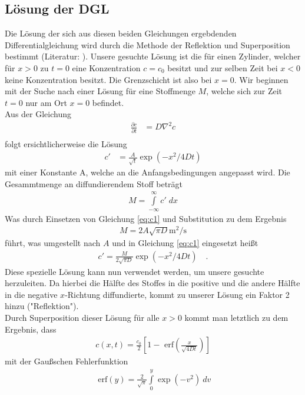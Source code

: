 \documentclass[12pt,a4paper,titlepage,headinclude,bibtotoc]{scrartcl}
\newcommand{\erf}[1]{\text{ erf}\ensuremath{\left( #1 \right)}}
\begin{document}
\subsection{Lösung der DGL}
Die Lösung der sich aus diesen beiden Gleichungen ergebdenden Differentialgleichung wird durch die Methode der Reflektion und Superposition bestimmt (Literatur: \cite[S. 11]{crank}).
Unsere gesuchte Lösung ist die für einen Zylinder, welcher für $x>0$ zu $t=0$ eine Konzentration $c=c_0$ besitzt und zur selben Zeit bei $x<0$ keine Konzentration besitzt.
Die Grenzschicht ist also bei $x=0$.
Wir beginnen mit der Suche nach einer Lösung für eine Stoffmenge $M$, welche sich zur Zeit $t=0$ nur am Ort $x=0$ befindet.\\
Aus der Gleichung
\begin{align*}
\frac{\partial c}{\partial t}&=D\nabla^2 c\\
\end{align*}
folgt ersichtlicherweise die Lösung
\begin{align}
c'&=\frac{A}{\sqrt{t}}\exp\left(-x^2/4Dt \right)\label{eq:c1}
\end{align}
mit einer Konstante A, welche an die Anfangsbedingungen angepasst wird.
Die Gesammtmenge an diffundierendem Stoff beträgt
\begin{align*}
M=\int\limits_{-\infty}^\infty c' \; dx
\end{align*}
Was durch Einsetzen von Gleichung \eqref{eq:c1} und Substitution zu dem Ergebnis
\begin{align*}
M=2A\sqrt{\pi D}\text{m}^2/\text{s}
\end{align*}
führt, was umgestellt nach $A$ und in Gleichung \eqref{eq:c1} eingesetzt heißt
\begin{align*}
c'=\frac{M}{2\sqrt{\pi D}}\exp\left(-x^2/4Dt\right)\quad .
\end{align*}
Diese spezielle Lösung kann nun verwendet werden, um unsere gesuchte herzuleiten.
Da hierbei die Hälfte des Stoffes in die positive und die andere Hälfte in die negative $x$-Richtung diffundierte, kommt zu unserer Lösung ein Faktor 2 hinzu ("Reflektion").\\
Durch Superposition dieser Lösung für alle $x>0$ kommt man letztlich zu dem Ergebnis, dass
\begin{align}
c(x,t)=\frac{c_0}{2}\left[1-\erf{\frac{x}{\sqrt{4Dt}}}\right] \label{eq:c}
\end{align}
mit der Gaußschen Fehlerfunktion
\begin{align*}
\erf{y}=\frac{2}{\sqrt{\pi}}\int\limits_0^y\exp\left(-v^2\right)~dv
\end{align*}
\end{document}
